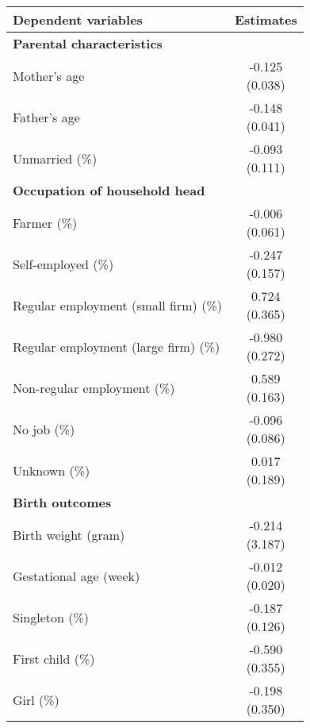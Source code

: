 \begin{tabular}{lc}
\hline \hline
Dependent variables & Estimates \\
\hline
\textbf{Parental characteristics} &  \\
Mother's age & \makecell[tc]{-0.125\\(0.038)} \\
Father's age & \makecell[tc]{-0.148\\(0.041)} \\
Unmarried (\%) & \makecell[tc]{-0.093\\(0.111)} \\
\hline
\textbf{Occupation of household head} &  \\
Farmer (\%) & \makecell[tc]{-0.006\\(0.061)} \\
Self-employed (\%) & \makecell[tc]{-0.247\\(0.157)} \\
Regular employment (small firm) (\%) & \makecell[tc]{0.724\\(0.365)} \\
Regular employment (large firm) (\%) & \makecell[tc]{-0.980\\(0.272)} \\
Non-regular employment (\%) & \makecell[tc]{0.589\\(0.163)} \\
No job (\%) & \makecell[tc]{-0.096\\(0.086)} \\
Unknown (\%) & \makecell[tc]{0.017\\(0.189)} \\
\hline
\textbf{Birth outcomes} &  \\
Birth weight (gram) & \makecell[tc]{-0.214\\(3.187)} \\
Gestational age (week) & \makecell[tc]{-0.012\\(0.020)} \\
Singleton (\%) & \makecell[tc]{-0.187\\(0.126)} \\
First child (\%) & \makecell[tc]{-0.590\\(0.355)} \\
Girl (\%) & \makecell[tc]{-0.198\\(0.350)} \\
\hline \hline
\end{tabular}